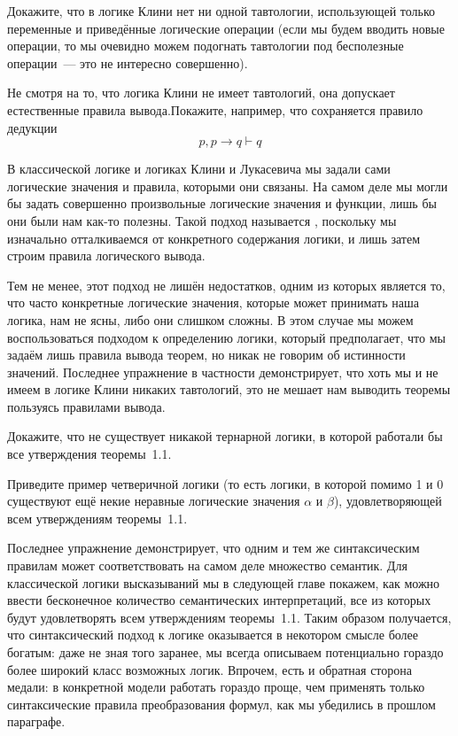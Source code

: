 \begin{exercise}
Докажите, что в логике Клини нет ни одной тавтологии, использующей только переменные и приведённые логические операции (если мы будем вводить новые операции, то мы очевидно можем подогнать тавтологии под бесполезные операции~— это не интересно совершенно).
\end{exercise}

\begin{exercise}
Не смотря на то, что логика Клини не имеет тавтологий, она допускает естественные правила вывода.Покажите, например, что сохраняется правило дедукции
$$p, p\to q\vdash q$$
\end{exercise}

В классической логике и логиках Клини и Лукасевича мы задали сами логические значения и правила, которыми они связаны. На самом деле мы могли бы задать совершенно произвольные логические значения и функции, лишь бы они были нам как-то полезны. Такой подход называется , поскольку мы изначально отталкиваемся от конкретного содержания логики, и лишь затем строим правила логического вывода.

Тем не менее, этот подход не лишён недостатков, одним из которых является то, что часто конкретные логические значения, которые может принимать наша логика, нам не ясны, либо они слишком сложны. В этом случае мы можем воспользоваться  подходом к определению логики, который предполагает, что мы задаём лишь правила вывода теорем, но никак не говорим об истинности значений. Последнее упражнение в частности демонстрирует, что хоть мы и не имеем в логике Клини никаких тавтологий, это не мешает нам выводить теоремы пользуясь правилами вывода.

\begin{exercise}
Докажите, что не существует никакой тернарной логики, в которой работали бы все утверждения теоремы~1.1.
\end{exercise}

\begin{exercise}
Приведите пример четверичной логики (то есть логики, в которой помимо 1 и 0 существуют ещё некие неравные логические значения $\alpha$ и $\beta$), удовлетворяющей всем утверждениям теоремы~1.1.
\end{exercise}

Последнее упражнение демонстрирует, что одним и тем же синтаксическим правилам может соответствовать на самом деле множество семантик. Для классической логики высказываний мы в следующей главе покажем, как можно ввести бесконечное количество семантических интерпретаций, все из которых будут удовлетворять всем утверждениям теоремы~1.1. Таким образом получается, что синтаксический подход к логике оказывается в некотором смысле более богатым: даже не зная того заранее, мы всегда описываем потенциально гораздо более широкий класс возможных логик. Впрочем, есть и обратная сторона медали: в конкретной модели работать гораздо проще, чем применять только синтаксические правила преобразования формул, как мы убедились в прошлом параграфе.

